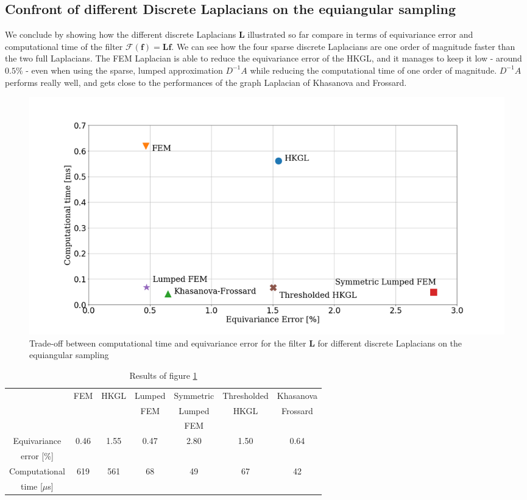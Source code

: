 \subsection{Confront of different Discrete Laplacians on the equiangular sampling}
We conclude by showing how the different discrete Laplacians $\mathbf L$ illustrated so far compare in terms of equivariance error and computational time of the filter $\mathcal F(\mathbf f) = \mathbf L\mathbf f$. We can see how the four sparse discrete Laplacians are one order of magnitude faster than the two full Laplacians. The FEM Laplacian is able to reduce the equivariance error of the HKGL, and it manages to keep it low - around $0.5\%$ - even when using the sparse, lumped approximation $D^{-1}A$ while reducing the computational time of one order of magnitude. $D^{-1}A$ performs really well, and gets close to the performances of the graph Laplacian of Khasanova and Frossard. 
\begin{figure}[h!]
	\centering
	\includegraphics[width=\textwidth]{../codes/06.Equivariance_error/tradeoff.png}
	\caption{\label{fig:tradeoff}Trade-off between computational time and equivariance error for the filter $\mathbf L$ for different discrete Laplacians on the equiangular sampling}
\end{figure}

\begin{table}[h!]
	\centering
	\footnotesize
	\begin{tabular}{ c|c |c|c|c|c|c } 
		& FEM & HKGL & Lumped & Symmetric & Thresholded & Khasanova  \\
		&&&FEM&Lumped&HKGL&Frossard\\
		&&&& FEM&&\\
		\hline
		Equivariance & 0.46 & 1.55 & 0.47 & 2.80& 1.50 & 0.64\\
		error [\%]&&&&&&\\ \hline
		Computational & 619 & 561 & 68 & 49 & 67 & 42 \\
		 time [$\mu$s]&&&&&&
	\end{tabular}
	\caption{\label{table:res}Results of figure \ref{fig:tradeoff}}
\end{table}

